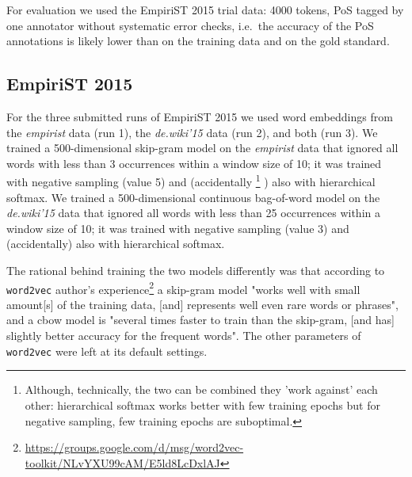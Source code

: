 \documentclass[11pt]{article}
\begin{document}
For evaluation we used the EmpiriST 2015 trial data: 4000 tokens, PoS tagged by
one annotator without systematic error checks, i.e.~the accuracy of the PoS
annotations is likely lower than on the training data and on the gold standard.

\subsection{EmpiriST 2015}
\label{ssec:case_empirist}

For the three submitted  runs of EmpiriST 2015 we used word embeddings from the
\emph{empirist} data (run 1), the \emph{de.wiki'15} data (run 2), and both (run
3).  We trained a 500-dimensional skip-gram model on the \emph{empirist} data
that ignored all words with less than 3 occurrences within a window size of 10;
it was trained with negative sampling (value 5) and (accidentally%
\footnote{Although, technically, the two can be combined they 'work against'
each other: hierarchical softmax works better with few training epochs but for
negative sampling, few training epochs are suboptimal.}%
) also with hierarchical softmax.
We trained a 500-dimensional continuous bag-of-word model on the
\emph{de.wiki'15} data that ignored all words with less than 25 occurrences
within a window size of 10; it was trained with negative sampling (value 3) and
(accidentally) also with hierarchical softmax.

The rational behind training the two models differently was that according to
\texttt{word2vec} author's
experience\footnote{\url{https://groups.google.com/d/msg/word2vec-toolkit/NLvYXU99cAM/E5ld8LcDxlAJ}}
a skip-gram model "works well with small amount[s] of the training data, [and]
represents well even rare words or phrases", and a cbow model is "several times
faster to train than the skip-gram, [and has] slightly better accuracy for the
frequent words".
The other parameters of \texttt{word2vec} were left at its default settings.
\end{document}
